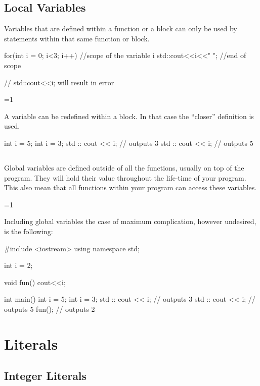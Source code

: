 \documentclass[10pt,a4paper]{scrartcl}
\gdef\conditionmacro{1}
\begin{document}
\begin{multicols*}{2}
\subsection{Local Variables}

Variables that are defined within a function or a block can only be used by statements within that same function or block.

\begin{TPCpp}
for(int i = 0; i<3; i++){ //scope of the variable i
	std::cout<<i<<" ";
} //end of scope

// std::cout<<i; will result in error
\end{TPCpp}

\ifnum\conditionmacro=1

A variable can be redefined within a block. In that case the ``closer'' definition is used.

\begin{TPCpp}
int i = 5;
{
	int i = 3;
	std :: cout << i; // outputs 3
}
std :: cout << i; // outputs 5
\end{TPCpp}
\fi

\subsection{}

Global variables are defined outside of all the functions, usually on top of the program. They will hold their value throughout the life-time of your program. This also mean that all functions within your program can access these variables.

\ifnum\conditionmacro=1

Including global variables the case of maximum complication, however undesired, is the following:

\begin{TPCpp}
#include <iostream>
using namespace std;

int i = 2;

void fun(){
	cout<<i;
}

int main(){
	int i = 5;
	{
		int i = 3;
		std :: cout << i;   // outputs 3
	}
	std :: cout << i;     // outputs 5
	fun();                // outputs 2
}
\end{TPCpp}
\fi

\section{Literals}

\subsection{Integer Literals}


\end{multicols*}
\end{document}
